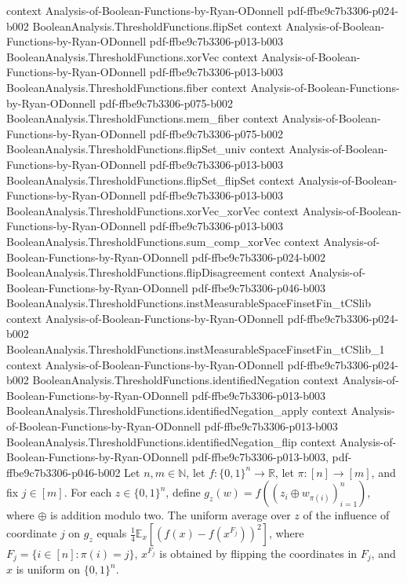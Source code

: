 \begin{lemma}
  {context}
  {Analysis-of-Boolean-Functions-by-Ryan-ODonnell}
  {pdf-ffbe9c7b3306-p024-b002}
\proofstep
  {BooleanAnalysis.ThresholdFunctions.flipSet}
  {context}
  {Analysis-of-Boolean-Functions-by-Ryan-ODonnell}
  {pdf-ffbe9c7b3306-p013-b003}
\proofstep
  {BooleanAnalysis.ThresholdFunctions.xorVec}
  {context}
  {Analysis-of-Boolean-Functions-by-Ryan-ODonnell}
  {pdf-ffbe9c7b3306-p013-b003}
\proofstep
  {BooleanAnalysis.ThresholdFunctions.fiber}
  {context}
  {Analysis-of-Boolean-Functions-by-Ryan-ODonnell}
  {pdf-ffbe9c7b3306-p075-b002}
\proofstep
  {BooleanAnalysis.ThresholdFunctions.mem_fiber}
  {context}
  {Analysis-of-Boolean-Functions-by-Ryan-ODonnell}
  {pdf-ffbe9c7b3306-p075-b002}
\proofstep
  {BooleanAnalysis.ThresholdFunctions.flipSet_univ}
  {context}
  {Analysis-of-Boolean-Functions-by-Ryan-ODonnell}
  {pdf-ffbe9c7b3306-p013-b003}
\proofstep
  {BooleanAnalysis.ThresholdFunctions.flipSet_flipSet}
  {context}
  {Analysis-of-Boolean-Functions-by-Ryan-ODonnell}
  {pdf-ffbe9c7b3306-p013-b003}
\proofstep
  {BooleanAnalysis.ThresholdFunctions.xorVec_xorVec}
  {context}
  {Analysis-of-Boolean-Functions-by-Ryan-ODonnell}
  {pdf-ffbe9c7b3306-p013-b003}
\proofstep
  {BooleanAnalysis.ThresholdFunctions.sum_comp_xorVec}
  {context}
  {Analysis-of-Boolean-Functions-by-Ryan-ODonnell}
  {pdf-ffbe9c7b3306-p024-b002}
\proofstep
  {BooleanAnalysis.ThresholdFunctions.flipDisagreement}
  {context}
  {Analysis-of-Boolean-Functions-by-Ryan-ODonnell}
  {pdf-ffbe9c7b3306-p046-b003}
\proofstep
  {BooleanAnalysis.ThresholdFunctions.instMeasurableSpaceFinsetFin_tCSlib}
  {context}
  {Analysis-of-Boolean-Functions-by-Ryan-ODonnell}
  {pdf-ffbe9c7b3306-p024-b002}
\proofstep
  {BooleanAnalysis.ThresholdFunctions.instMeasurableSpaceFinsetFin_tCSlib_1}
  {context}
  {Analysis-of-Boolean-Functions-by-Ryan-ODonnell}
  {pdf-ffbe9c7b3306-p024-b002}
\proofstep
  {BooleanAnalysis.ThresholdFunctions.identifiedNegation}
  {context}
  {Analysis-of-Boolean-Functions-by-Ryan-ODonnell}
  {pdf-ffbe9c7b3306-p013-b003}
\proofstep
  {BooleanAnalysis.ThresholdFunctions.identifiedNegation_apply}
  {context}
  {Analysis-of-Boolean-Functions-by-Ryan-ODonnell}
  {pdf-ffbe9c7b3306-p013-b003}
\proofstep
  {BooleanAnalysis.ThresholdFunctions.identifiedNegation_flip}
  {context}
  {Analysis-of-Boolean-Functions-by-Ryan-ODonnell}
  {pdf-ffbe9c7b3306-p013-b003,
    pdf-ffbe9c7b3306-p046-b002}
Let $n,m\in\mathbb N$, let $f:\{0,1\}^n\to\mathbb R$, let $\pi:[n]\to[m]$, and fix
$j\in[m]$. For each $z\in\{0,1\}^n$, define $g_z(w)=f((z_i\oplus w_{\pi(i)})_{i=1}^n)$,
where $\oplus$ is addition modulo two. The uniform average over $z$ of the influence of
coordinate $j$ on $g_z$ equals $\frac14\mathbb E_x[(f(x)-f(x^{F_j}))^2]$, where
$F_j=\{i\in[n]:\pi(i)=j\}$, $x^{F_j}$ is obtained by flipping the coordinates in $F_j$,
and $x$ is uniform on $\{0,1\}^n$.
\end{lemma}

